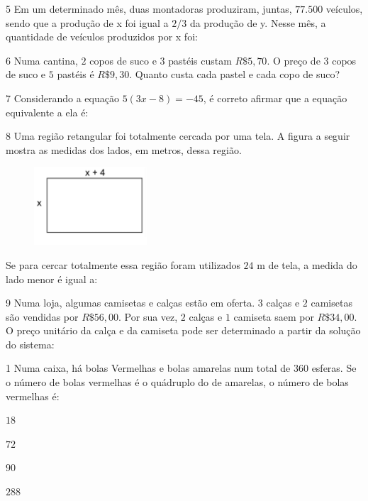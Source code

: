 {\num{5}  Em um determinado mês, duas montadoras produziram, juntas, $77.500$
veículos, sendo que a produção de x foi igual a $2/3$ da produção de y. Nesse mês, a quantidade de veículos produzidos por x foi:


\num{6}  Numa cantina, $2$ copos de suco e $3$ pastéis custam $R\$5,70$. O preço de
3 copos de suco e $5$ pastéis é $R\$9,30$. Quanto custa cada pastel e cada
copo de suco?


\num{7}  Considerando a equação $5(3x - 8) = -45$, é correto afirmar que a equação equivalente a ela é:


\num{8}  Uma região retangular foi totalmente cercada por uma tela. A figura a
seguir mostra as medidas dos lados, em metros, dessa região.

\begin{figure}
\includegraphics[width=1.65625in,height=1.14583in]{./imgSAEB_6_MAT/media/image38.png}
\end{figure}

Se para cercar totalmente essa região foram utilizados $24$ m de tela, a
medida do lado menor é igual a:


\num{9} Numa loja, algumas camisetas e calças estão em oferta. $3$ calças e $2$
camisetas são vendidas por $R\$56,00$. Por sua vez, $2$ calças e $1$ camiseta
saem por $R\$34,00$. O preço unitário da calça e da camiseta pode ser
determinado a partir da solução do sistema:



\num{1}  Numa caixa, há bolas Vermelhas e bolas amarelas num total de $360$
esferas. Se o número de bolas vermelhas é o quádruplo do de amarelas, o
número de bolas vermelhas é:

\begin{escolha}
\item $18$
\item $72$
\item $90$
\item $288$
\end{escolha}

}

